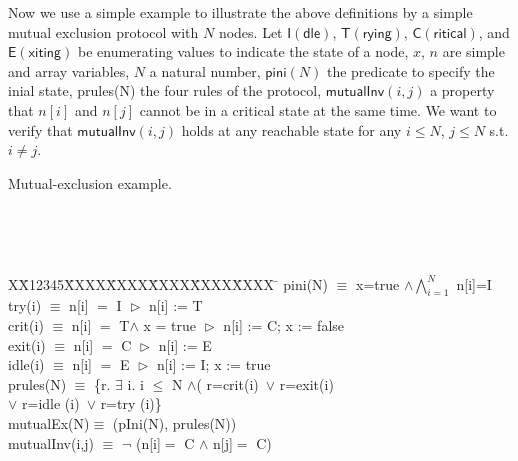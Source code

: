 \documentclass[final]{IEEEtran}
\newlength{\fminilength}
\newenvironment{fmini}[1][\linewidth]
  {\setlength{\fminilength}{#1\fboxsep-2\fboxrule}%
   \vspace{2ex}\noindent\begin{lrbox}{\fminibox}\begin{minipage}{\fminilength}%
   \mbox{ }\hfill\vspace{-2.5ex}}%
  {\end{minipage}\end{lrbox}\vspace{1ex}\hspace{0ex}%
   \framebox{\usebox{\fminibox}}}
\newenvironment{specification}
{\noindent\scriptsize
\tt\begin{fmini}\begin{tabbing}X\=X12345\=XXXX\=XXXX\=XXXX\=XXXX\=XXXX
\=\+\kill} {\end{tabbing}\normalfont\end{fmini}}
\def \eqc {=}
\def \andc {\wedge }
\def \negc {\lnot}
\newcommand{\forget}[1]{}
\begin{document}
Now we use a simple example to illustrate the above definitions by a simple mutual exclusion protocol with $N$ nodes. Let $\mathsf{I(dle)}$, $\mathsf{T(rying)}$,
 $\mathsf{C(ritical)}$, and  $\mathsf{E(xiting)}$  be enumerating values to indicate the state of a node, $x$,    $n$ are  simple and array variables, $N$ a natural number,  $\mathsf{pini}(N)$   the predicate to specify the inial state, prules(N) the four rules of the protocol, $\mathsf{mutualInv}(i,j)$ a property that $n[i]$ and $ n[j]$ cannot be in a critical state at the same time. We want to verify that $\mathsf{mutualInv}(i,j)$ holds at any reachable state for any $i\le N$, $j \le N$ s.t. $i \neq j$.
\vspace{-0.3cm}
\begin{example}\label{example1}Mutual-exclusion example.

\begin{specification}
 pini(N) $\equiv$
   x=true $\wedge  \bigwedge^N_{i=1}$ n[i]=I \\

    try(i) $\equiv$ n[i] $\eqc$ I $\vartriangleright$ n[i] := T \\

    crit(i) $\equiv$ n[i] $\eqc$ T$\wedge$ x = true $\vartriangleright$  n[i] := C; x := false\\

%
   exit(i) $\equiv$ n[i] $\eqc$ C $\vartriangleright$ n[i] := E \\


   idle(i) $\equiv$  n[i] $\eqc$ E $\vartriangleright$ n[i] := I;  x := true
  \\%
   prules(N) $\equiv$ \{r. $\exists$ i. i $\le$ N $\wedge$( r=crit(i)~$\vee$ r=exit(i) \\
    $\vee$ r=idle (i)~$\vee$ r=try (i)\}\\

mutualEx(N)$\equiv$ (pIni(N), prules(N))\\

mutualInv(i,j) $\equiv$
  $\negc$ (n[i]$\eqc$ C $\andc$ n[j]$\eqc$ C)\\



\end{specification}
\end{example}


\forget{As Hoare logics specifies,  after executing statement $\alpha$, $f$ holds iff $\mathsf{preCond}(f, \alpha)$ holds before the execution.
\begin{lemma}\label{lemma-preCond}
Suppose $s\overset{\r}{\rightarrow } s'$,
$s\models \mathsf{preCond} (f, \mathsf{act}(r))$ if and only if $s'\models f$
\end{lemma}
}
\end{document}
